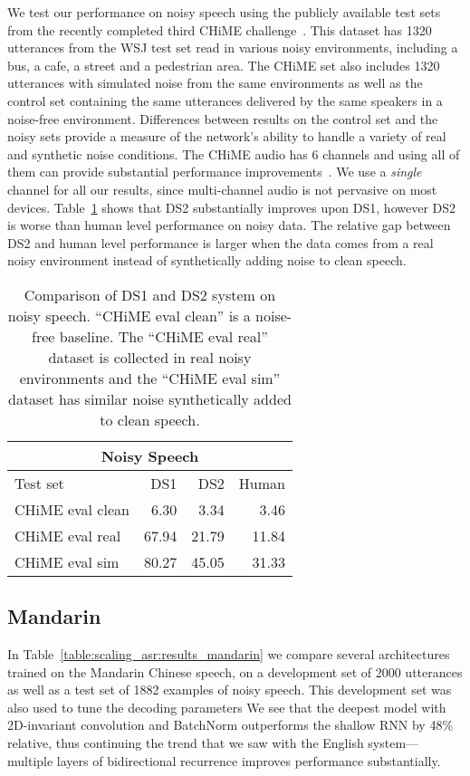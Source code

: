 We test our performance on noisy speech using the publicly available test sets
from the recently completed third CHiME challenge~\cite{barker2015chime}. This
dataset has 1320 utterances from the WSJ test set read in various noisy
environments, including a bus, a cafe, a street and a pedestrian area. The
CHiME set also includes 1320 utterances with simulated noise from the same
environments as well as the control set containing the same utterances
delivered by the same speakers in a noise-free environment. Differences between
results on the control set and the noisy sets provide a measure of the
network's ability to handle a variety of real and synthetic noise conditions.
The CHiME audio has 6 channels and using all of them can provide substantial
performance improvements~\cite{yoshioka2015}. We use a {\it single} channel for
all our results, since multi-channel audio is not pervasive on most devices.
Table~\ref{table:scaling_asr:chime} shows that DS2 substantially improves upon
DS1, however DS2 is worse than human level performance on noisy data. The
relative gap between DS2 and human level performance is larger when the data
comes from a real noisy environment instead of synthetically adding noise to
clean speech.

\begin{table}
\centering
\begin{tabular}{l  r  r r}
\toprule
\multicolumn{4}{c}{Noisy Speech}\\
\midrule
Test set & DS1 & DS2  &  Human \\
\midrule
CHiME eval clean & 6.30  & 3.34  & 3.46 \\
CHiME eval real  & 67.94 & 21.79 & 11.84 \\
CHiME eval sim   & 80.27 & 45.05 & 31.33 \\
\bottomrule
\end{tabular}
\caption{Comparison of DS1 and DS2 system on noisy speech. ``CHiME eval clean''
         is a noise-free baseline. The ``CHiME eval real'' dataset is collected in
         real noisy environments and the ``CHiME eval sim'' dataset has similar
         noise synthetically added to clean speech.}
\label{table:scaling_asr:chime}
\end{table}

\subsection{Mandarin}
\label{sec:scaling_asr:results_mandarin}

In Table~\ref{table:scaling_asr:results_mandarin} we compare several
architectures trained on the Mandarin Chinese speech, on a development set of
2000 utterances as well as a test set of 1882 examples of noisy speech. This
development set was also used to tune the decoding parameters We see that the
deepest model with 2D-invariant convolution and BatchNorm outperforms the
shallow RNN by 48\% relative, thus continuing the trend that we saw with the
English system---multiple layers of bidirectional recurrence improves
performance substantially. 

